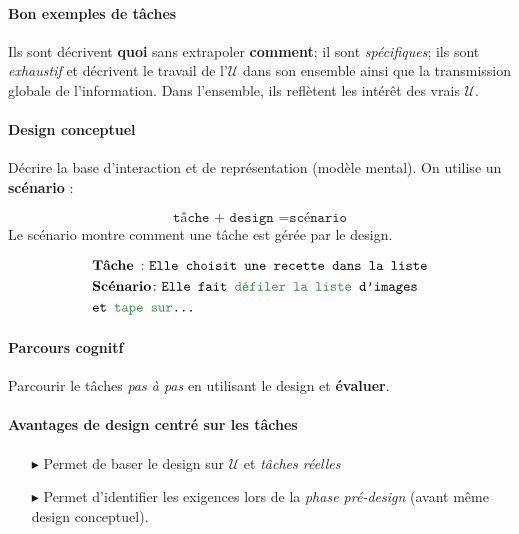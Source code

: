 \documentclass{report}
\begin{document}
\begin{multicols*}{3}
    \paragraph{Bon exemples de tâches} 
    Ils sont décrivent \textbf{quoi} sans extrapoler 
    \textbf{comment}; il sont 
    \textit{spécifiques}; ils sont \textit{exhaustif} et décrivent 
    le travail de l'$\mathcal{U}$ dans son ensemble ainsi que 
    la transmission globale de l'information. 
    Dans l'ensemble, 
    ils reflètent les intérêt des vrais $\mathcal{U}$. 

     \paragraph{Design conceptuel}
      Décrire la base d'interaction et de représentation 
      (modèle mental). On utilise un \textbf{scénario} :

      \[ \texttt{tâche + design } = \texttt{scénario}    \]
    Le scénario montre comment une tâche est gérée par le 
    design. 

    \begin{align*}
      &\textbf{Tâche } \colon 
          \texttt{Elle choisit une recette dans la liste} \\
      &\textbf{Scénario} \colon     
          \texttt{Elle fait \textcolor{myg}{défiler la liste} 
        d'images} \\ 
      &\texttt{et \textcolor{myg}{tape sur}\dots  }  
    \end{align*}        


    \paragraph{Parcours cognitf}
    Parcourir le tâches \textit{pas à pas} en utilisant le 
    design et \textbf{évaluer}.   


    \paragraph{Avantages de design centré sur les tâches}
    \begin{itemize}
      \item [$\blacktriangleright$ ] Permet de baser le design 
        sur $\mathcal{U}$ et \textit{tâches réelles}  
      \item [$\blacktriangleright$ ] Permet d'identifier les 
        exigences lors de la \textit{phase pré-design} 
        (avant même design conceptuel). 
    \end{itemize}


\end{multicols*}
\end{document}
